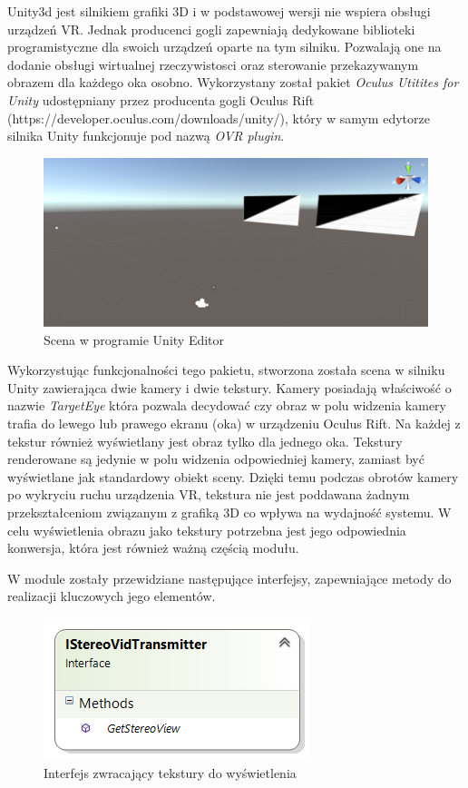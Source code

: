 \documentclass[a4paper,11pt,twoside]{report}
\theoremstyle{definition}
\begin{document}
Unity3d jest silnikiem grafiki 3D i w podstawowej wersji nie wspiera obsługi urządzeń VR. Jednak producenci gogli zapewniają dedykowane biblioteki programistyczne dla swoich urządzeń oparte na tym silniku. Pozwalają one na dodanie obsługi wirtualnej rzeczywistosci oraz sterowanie przekazywanym obrazem dla każdego oka osobno. Wykorzystany został pakiet \textit{Oculus Utitites for Unity} udostępniany przez producenta gogli Oculus Rift (https://developer.oculus.com/downloads/unity/), który w samym edytorze silnika Unity funkcjonuje pod nazwą \textit{OVR plugin}.  \hfill \\

\begin{figure}[h]
\centering
\includegraphics[scale=0.5]{images/unityscene}
\caption[Scena Unity]{Scena w programie Unity Editor}
\end{figure}

Wykorzystując funkcjonalności tego pakietu, stworzona została scena w silniku Unity zawierająca dwie kamery i dwie tekstury. Kamery posiadają właściwość o nazwie \textit{TargetEye} która pozwala decydować czy obraz w polu widzenia kamery trafia do lewego lub prawego ekranu (oka) w urządzeniu Oculus Rift. Na każdej z tekstur również wyświetlany jest obraz tylko dla jednego oka. Tekstury renderowane są jedynie w polu widzenia odpowiedniej kamery, zamiast być wyświetlane jak standardowy obiekt sceny. Dzięki temu podczas obrotów kamery po wykryciu ruchu urządzenia VR, tekstura nie jest poddawana żadnym przekształceniom związanym z grafiką 3D  co wpływa na wydajność systemu. W celu wyświetlenia obrazu jako tekstury potrzebna jest jego odpowiednia konwersja, która jest również ważną częścią modułu.


W module zostały przewidziane następujące interfejsy, zapewniające metody do realizacji kluczowych jego elementów.

\begin{figure}[h]
\centering
\includegraphics[scale=0.9]{images/IStereoVidTransmitter}
\caption[Przekazywanie diagram]{Interfejs zwracający tekstury do wyświetlenia}
\end{figure}
\end{document}
